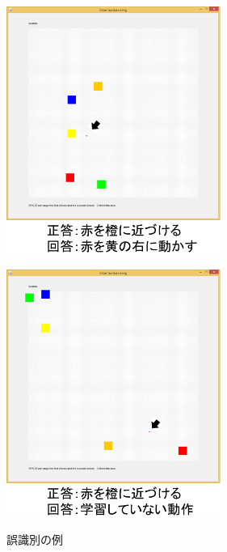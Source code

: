 \begin{figure}[h]
	\centering
	\begin{minipage}[t]{.47\textwidth}
		\centering
		\includegraphics[width=7cm]{figure4_a.png} \\ %
		\label{subfigure:failure1}    
	\end{minipage}
	\begin{minipage}[t]{.47\textwidth}
		\centering
		\includegraphics[width=7cm]{figure4_b.png} \\ %
		\label{subfigure:failure2}
	\end{minipage}
	\caption{誤識別の例}
	\label{figure:failure}
\end{figure}

